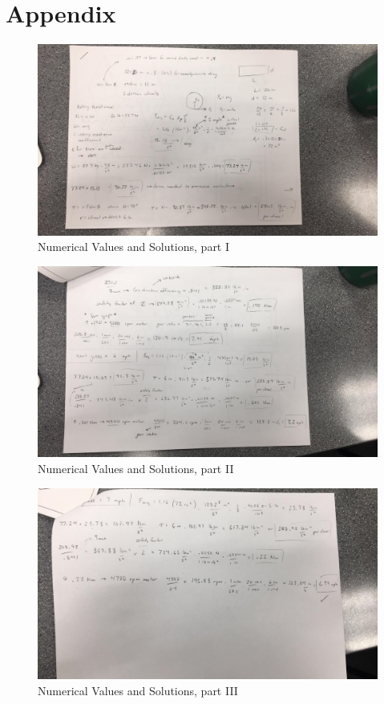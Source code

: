 \documentclass[12pt]{article}
\begin{document}
\section{Appendix}


\begin{figure}[H]
    \centering
    \includegraphics[width=1.1\linewidth]{PreliminaryDesignReport/calculations1.png}
    \caption{Numerical Values and Solutions, part I}
    \label{fig:my_label}
\end{figure}

\begin{figure}[H]
    \centering
    \includegraphics[width=1.1\linewidth]{PreliminaryDesignReport/calculations2.png}
    \caption{Numerical Values and Solutions, part II}
    \label{fig:my_label}
\end{figure}

\begin{figure}[H]
    \centering
    \includegraphics[width=1.1\linewidth]{PreliminaryDesignReport/Calculations3.png}
    \caption{Numerical Values and Solutions, part III}
    \label{fig:my_label}
\end{figure}
\end{document}

